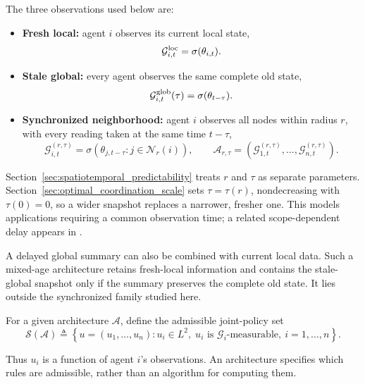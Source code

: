 \documentclass[11pt]{article}
\begin{document}
The three observations used below are:
\begin{itemize}
\item \textbf{Fresh local:} agent $i$ observes its current local state,
\begin{equation}
\mathcal G_{i,t}^{\rm loc}=\sigma(\theta_{i,t}).
\label{eq:fresh_local_arch}
\end{equation}
\item \textbf{Stale global:} every agent observes the same complete old state,
\begin{equation}
\mathcal G_{i,t}^{\rm glob}(\tau)=\sigma(\theta_{t-\tau}).
\label{eq:stale_global_arch}
\end{equation}
\item \textbf{Synchronized neighborhood:} agent $i$ observes all nodes within
radius $r$, with every reading taken at the same time $t-\tau$,
\begin{equation}
\mathcal G_{i,t}^{(r,\tau)}=\sigma(\theta_{j,t-\tau}:j\in\mathcal N_r(i)),
\qquad \mathcal A_{r,\tau}=(\mathcal G_{1,t}^{(r,\tau)},\ldots,\mathcal G_{n,t}^{(r,\tau)}).
\label{eq:radius_arch}
\end{equation}
\end{itemize}
Section~\ref{sec:spatiotemporal_predictability} treats $r$ and $\tau$ as
separate parameters. Section~\ref{sec:optimal_coordination_scale} sets
$\tau=\tau(r)$, nondecreasing with $\tau(0)=0$, so a wider snapshot replaces
a narrower, fresher one. This models applications requiring a common
observation time; a related scope-dependent delay appears in
\cite{ballotta2023latency}.

A delayed global summary can also be combined with current local data.
Such a mixed-age architecture retains fresh-local information and contains
the stale-global snapshot only if the summary preserves the complete old
state. It lies outside the synchronized family studied here.

For a given architecture $\mathcal{A}$, define the admissible joint-policy set
\begin{equation}
    \mathcal{S}(\mathcal{A})
    \triangleq
    \left\{
        u=(u_1,\ldots,u_n):
        u_i\in L^2,\;
        u_i \text{ is }\mathcal{G}_i\text{-measurable},
        \ i=1,\ldots,n
    \right\}.
    \label{eq:policy_subspace}
\end{equation}

Thus $u_i$ is a function of agent $i$'s observations. An architecture specifies
which rules are admissible, rather than an algorithm for computing them.
\end{document}
